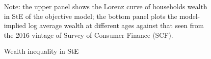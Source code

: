  \begin{comment}
 
\begin{figure}[!ht]
	\caption{Consumption functions under objective and subjective risk profiles}
	\label{fig:comparison1}
	\begin{center}
		\adjustimage{max size={0.8\linewidth}{0.5\paperheight}}{figures/comparison1.png}
\end{center}
\begin{flushleft}Note: this figure plots an example of age-specific optimal consumption policies under objective and subjective state-dependent income risk profiles, respectively. The two models use the exact same parameter configurations except for the subjective model having agents to stochatically draw a low or high risk perception. Both the average size of transitory and permanent risks are kept equal to that in the objective model.\end{flushleft}
\end{figure}

\newpage 

\begin{figure}[!ht]
	\caption{Consumption functions under objective and state-dependent risk profiles}
	\label{fig:comparison2}
	\begin{center}
		\adjustimage{max size={0.8\linewidth}{0.5\paperheight}}{figures/comparison2.png}
\end{center}
\begin{flushleft}Note: this figure plots age-specific optimal consumption policies under objective and subjective extrapolation model. The former model includes persistent unemployment risks while the latter maintains the same transition probability of employment status but allows the risk perceptions to be dependent upon the employment status of the individual, i.e. unemployed perceive income risks to be higher than the employed.\end{flushleft}
\end{figure}
\end{comment}


\clearpage


\begin{figure}[!ht]
	\caption{Wealth inequality in StE}
	\label{fig:StE_dist_objective}
	\begin{center}
\end{center}
\begin{flushleft}Note: the upper panel shows the Lorenz curve of households wealth in StE of the objective model; the bottom panel plots the model-implied log average wealth at different ages against that seen from the 2016 vintage of Survey of Consumer Finance (SCF). \end{flushleft}
\end{figure}




